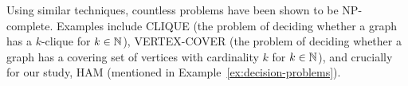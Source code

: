 Using similar techniques, countless problems have been shown to be \textsf{NP}-complete. Examples include \textsf{CLIQUE} (the problem of deciding whether a graph has a \(k\)-clique for \(k\in\mathbb{N}\)),  \textsf{VERTEX-COVER} (the problem of deciding whether a graph has a covering set of vertices with cardinality \(k\) for \(k\in\mathbb{N}\)), and crucially for our study, \textsf{HAM} (mentioned in Example~\ref{ex:decision-problems}).

